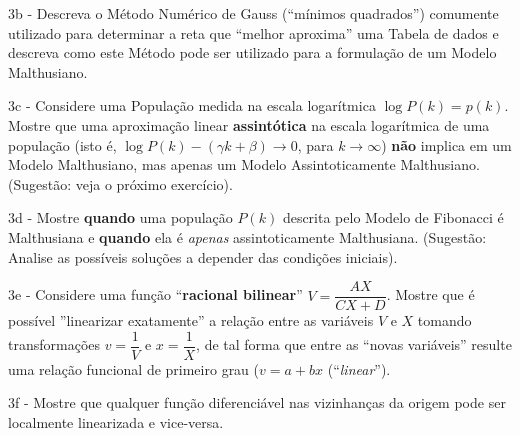     3b - Descreva o Método Numérico de Gauss (``mínimos quadrados'') comumente utilizado para determinar a reta que ``melhor aproxima'' uma Tabela de dados e descreva como este Método pode ser utilizado para a formulação de um Modelo Malthusiano.

    3c - Considere uma População medida na escala logarítmica \(\log P(k) = p(k)\). Mostre que uma aproximação linear \textbf{assintótica} na escala logarítmica  de uma população (isto é, \(\log P(k) - (\gamma k + \beta) \to 0\), para \(k \to \infty\)) \textbf{não} implica em um Modelo Malthusiano, mas apenas um Modelo Assintoticamente Malthusiano. (Sugestão: veja o próximo exercício).

    3d - Mostre \textbf{quando} uma população \(P(k)\) descrita pelo Modelo de Fibonacci é Malthusiana e \textbf{quando} ela é \textit{apenas} assintoticamente Malthusiana. (Sugestão: Analise as possíveis soluções a depender das condições iniciais).

    3e - Considere uma função ``\textbf{racional bilinear}'' \(V = \dfrac{AX}{CX+D}\). Mostre que é possível ''linearizar exatamente'' a relação entre as variáveis \(V\) e \(X\) tomando transformações \(v = \dfrac{1}{V}\) e \(x = \dfrac{1}{X}\), de tal forma que entre as ``novas variáveis'' resulte uma relação funcional de primeiro grau (\(v = a + bx\) (``\textit{linear}'').

    3f - Mostre que qualquer função diferenciável nas vizinhanças da origem pode ser localmente linearizada e vice-versa.

